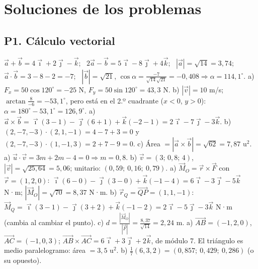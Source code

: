 \documentclass[11pt,a4paper]{article}
\newcommand{\ii}{\vec{\imath}}
\newcommand{\jj}{\vec{\jmath}}
\newcommand{\kk}{\vec{k}}
\begin{document}
\newpage
\section{Soluciones de los problemas}
\small
\subsection*{P1. Cálculo vectorial}
\begin{enumerate}[leftmargin=1.4cm,itemsep=4pt]
 $\vec a+\vec b=4\ii+2\jj-\kk$; \ $2\vec a-\vec b=5\ii-8\jj+4\kk$; \ $|\vec a|=\sqrt{14}=3{,}74$; \ $\vec a\cdot\vec b=3-8-2=-7$; \ $|\vec b|=\sqrt{21}$, $\cos\alpha=\frac{-7}{\sqrt{14}\sqrt{21}}=-0{,}408\Rightarrow\alpha=114{,}1^\circ$.
 a) $F_x=50\cos120^\circ=-25$ N, $F_y=50\sin120^\circ=43{,}3$ N. b) $|\vec v|=10$ m/s; $\arctan\frac{8}{-6}=-53{,}1^\circ$, pero está en el 2.º cuadrante ($x<0$, $y>0$): $\alpha=180^\circ-53{,}1^\circ=126{,}9^\circ$.
 a) $\vec a\times\vec b=\ii(3-1)-\jj(6+1)+\kk(-2-1)=2\ii-7\jj-3\kk$. b) $(2,-7,-3)\cdot(2,1,-1)=4-7+3=0$ y $(2,-7,-3)\cdot(1,-1,3)=2+7-9=0$. c) Área $=|\vec a\times\vec b|=\sqrt{62}=7{,}87$ u$^2$.
 a) $\vec u\cdot\vec v=3m+2m-4=0\Rightarrow m=0{,}8$. b) $\vec v=(3;\,0{,}8;\,4)$, $|\vec v|=\sqrt{25{,}64}=5{,}06$; unitario: $(0{,}59;\ 0{,}16;\ 0{,}79)$.
 a) $\vec M_O=\vec r\times\vec F$ con $\vec r=(1,2,0)$: $\ii(6-0)-\jj(3-0)+\kk(-1-4)=6\ii-3\jj-5\kk$ N·m; $|\vec M_O|=\sqrt{70}=8{,}37$ N·m. b) $\vec r_Q=\overrightarrow{QP}=(1,1,-1)$: $\vec M_Q=\ii(3-1)-\jj(3+2)+\kk(-1-2)=2\ii-5\jj-3\kk$ N·m (cambia al cambiar el punto). c) $d=\frac{|\vec M_O|}{|\vec F|}=\frac{8{,}37}{\sqrt{14}}=2{,}24$ m.
 a) $\overrightarrow{AB}=(-1,2,0)$, $\overrightarrow{AC}=(-1,0,3)$; $\overrightarrow{AB}\times\overrightarrow{AC}=6\ii+3\jj+2\kk$, de módulo 7. El triángulo es medio paralelogramo: área $=3{,}5$ u$^2$. b) $\frac{1}{7}(6,3,2)=(0{,}857;\ 0{,}429;\ 0{,}286)$ (o su opuesto).
\end{enumerate}
\end{document}
